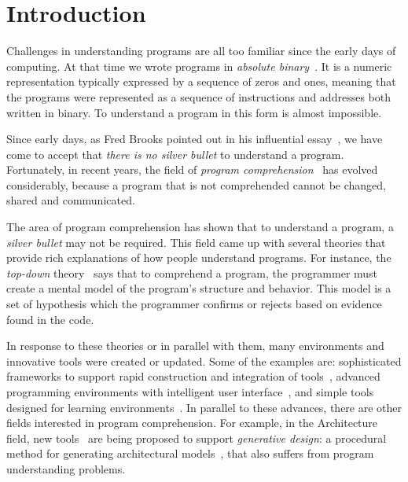
% 
% 

\section{Introduction}

Challenges in understanding programs are all too familiar since the early days of computing. At that time we wrote programs in \textit{absolute binary}~\cite{hamming2003art}. It is a numeric representation typically expressed by a sequence of zeros and ones, meaning that the programs were represented as a sequence of instructions and addresses both written in binary. To understand a program in this form is almost impossible.

Since early days, as Fred Brooks pointed out in his influential essay~\cite{bullet1987essence}, we have come to accept that \textit{there is no silver bullet} to understand a program. Fortunately, in recent years, the field of \textit{program comprehension}~\cite{rugaber1995program} has evolved considerably, because a program that is not comprehended cannot be changed, shared and communicated.

The area of program comprehension has shown that to understand a program, a \textit{silver bullet} may not be required. This field came up with several theories that provide rich explanations of how people understand programs. For instance, the \textit{top-down} theory~\cite{brooks1977towards} says that to comprehend a program, the programmer must create a mental model of the program's structure and behavior. This model is a set of hypothesis which the programmer confirms or rejects based on evidence found in the code.

In response to these theories or in parallel with them, many environments and innovative tools were created or updated. Some of the examples are: sophisticated frameworks to support rapid construction and integration of tools~\cite{DesRivieres2004}, advanced programming environments with intelligent user interface~\cite{carlson2005eclipse,boudreau2002netbeans,intellij2001intellij,guckenheimer2006software}, and simple tools designed for learning environments~\cite{papert1980mindstorms,Kay1993,Reas2006,findler2002drscheme,GuoSIGCSE2013,mcdirmid2013usable}. In parallel to these advances, there are other fields interested in program comprehension. For example, in the Architecture field, new tools~\cite{aish2012designscript,lopes2011portable} are being proposed to support \textit{generative design}: a procedural method for generating architectural models~\cite{mccormack2004generative}, that also suffers from program understanding problems.

